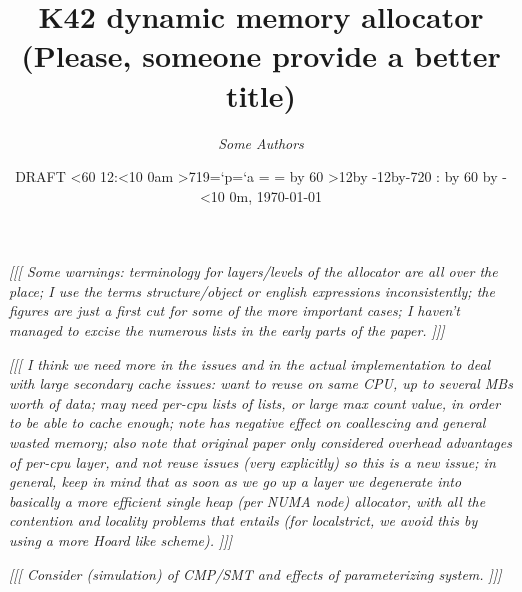 \documentclass[dvips,11pt]{article}
\newcommand\fixnote[1]{\emph{[[[ #1 ]]]}}
\def\now{\ifnum\time<60       %
          12:\ifnum\time<10 0\fi\number\time am %
         \else
            \ifnum\time>719\chardef\a=`p\else\chardef\a=`a\fi
          \hour=\time
                          \minute=\time
          \divide\hour by 60 %
          \ifnum\hour>12\advance\hour by -12\advance\minute by-720 \fi
          \number\hour:%
          \multiply\hour by 60 %
          \advance\minute by -\hour
          \ifnum\minute<10 0\fi\number\minute\a m\fi}
\begin{document}
\sloppy

\title{K42 dynamic memory allocator\\
\normalsize (Please, someone provide a better title)}

\author{ \em Some Authors }

\date{DRAFT \protect\now, \today}
\begin{singlespace}
\maketitle
\end{singlespace}




\fixnote{Some warnings: terminology for layers/levels of the allocator are
  all over the place; I use the terms structure/object or english
  expressions inconsistently;  the figures are just a first cut for some of 
  the more important cases; I haven't managed to excise the numerous lists
  in the early parts of the paper.}

\fixnote{I think we need more in the issues and in the actual
  implementation to deal with large secondary cache issues: want to reuse
  on same CPU, up to several MBs worth of data; may need per-cpu lists of
  lists, or large max count value, in order to be able to cache enough;
  note has negative effect on coallescing and general wasted memory; also
  note that original paper only considered overhead advantages of per-cpu
  layer, and not reuse issues (very explicitly) so this is a new issue; in
  general, keep in mind that as soon as we go up a layer we degenerate into 
  basically a more efficient single heap (per NUMA node) allocator, with
  all the contention and locality problems that entails (for localstrict,
  we avoid this by using a more Hoard like scheme).}

\fixnote{Consider (simulation) of CMP/SMT and effects of parameterizing
  system.} 
\end{document}
